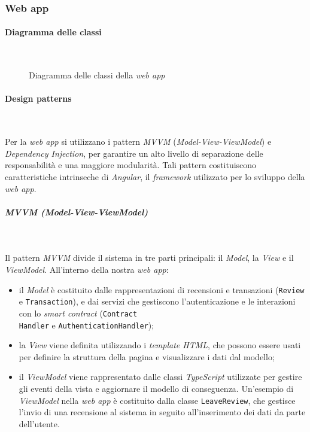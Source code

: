 \subsubsection{Web app}
\paragraph{Diagramma delle classi}~
\begin{figure}[H]
    
    \caption{Diagramma delle classi della \textit{web app}}\label{fig:webapp}
\end{figure}

\paragraph{Design patterns}~

\noindent Per la \textit{web app} si utilizzano i pattern \textit{MVVM} (\textit{Model-View-ViewModel}) e \textit{Dependency Injection}, per garantire un alto livello di separazione delle responsabilità e una maggiore modularità. Tali pattern costituiscono caratteristiche intrinseche di \textit{Angular}, il \textit{framework} utilizzato per lo sviluppo della \textit{web app}.

\subparagraph*{MVVM (Model-View-ViewModel)}~

\noindent Il pattern \textit{MVVM} divide il sistema in tre parti principali: il \textit{Model}, la \textit{View} e il \textit{ViewModel}. All'interno della nostra \textit{web app}:
\begin{itemize}
    \item il \textit{Model} è costituito dalle rappresentazioni di recensioni e transazioni (\texttt{Review} e \texttt{Transaction}), e dai servizi che gestiscono l'autenticazione e le interazioni con lo \textit{smart contract} (\texttt{Contract\\Handler} e \texttt{AuthenticationHandler});
    \item la \textit{View} viene definita utilizzando i \textit{template HTML}, che possono essere usati per definire la struttura della pagina e visualizzare i dati dal modello;
    \item il \textit{ViewModel} viene rappresentato dalle classi \textit{TypeScript} utilizzate per gestire gli eventi della vista e aggiornare il modello di conseguenza. Un'esempio di \textit{ViewModel} nella \textit{web app} è costituito dalla classe \texttt{LeaveReview}, che gestisce l'invio di una recensione al sistema in seguito all'inserimento dei dati da parte dell'utente.
\end{itemize}

